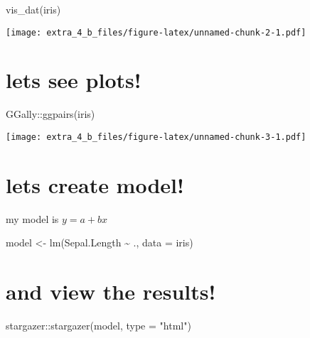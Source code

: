 \documentclass[
]{article}
\newenvironment{Shaded}{\begin{snugshade}}{\end{snugshade}}
\newcommand{\AttributeTok}[1]{\textcolor[rgb]{0.77,0.63,0.00}{#1}}
\newcommand{\FunctionTok}[1]{\textcolor[rgb]{0.00,0.00,0.00}{#1}}
\newcommand{\NormalTok}[1]{#1}
\newcommand{\OtherTok}[1]{\textcolor[rgb]{0.56,0.35,0.01}{#1}}
\newcommand{\SpecialCharTok}[1]{\textcolor[rgb]{0.00,0.00,0.00}{#1}}
\newcommand{\StringTok}[1]{\textcolor[rgb]{0.31,0.60,0.02}{#1}}
\begin{document}
\begin{Shaded}
\begin{Highlighting}[]
\FunctionTok{vis\_dat}\NormalTok{(iris)}
\end{Highlighting}
\end{Shaded}

\texttt{[image: extra\_4\_b\_files/figure-latex/unnamed-chunk-2-1.pdf]}

\hypertarget{lets-see-plots}{%
\section{lets see plots!}\label{lets-see-plots}}

\begin{Shaded}
\begin{Highlighting}[]
\NormalTok{GGally}\SpecialCharTok{::}\FunctionTok{ggpairs}\NormalTok{(iris)}
\end{Highlighting}
\end{Shaded}

\texttt{[image: extra\_4\_b\_files/figure-latex/unnamed-chunk-3-1.pdf]}

\hypertarget{lets-create-model}{%
\section{lets create model!}\label{lets-create-model}}

my model is \(y = a + bx\)

\begin{Shaded}
\begin{Highlighting}[]
\NormalTok{model }\OtherTok{\textless{}{-}} \FunctionTok{lm}\NormalTok{(Sepal.Length }\SpecialCharTok{\textasciitilde{}}\NormalTok{ ., }\AttributeTok{data =}\NormalTok{ iris)}
\end{Highlighting}
\end{Shaded}

\hypertarget{and-view-the-results}{%
\section{and view the results!}\label{and-view-the-results}}

\begin{Shaded}
\begin{Highlighting}[]
\NormalTok{stargazer}\SpecialCharTok{::}\FunctionTok{stargazer}\NormalTok{(model, }\AttributeTok{type =} \StringTok{"html"}\NormalTok{)}
\end{Highlighting}
\end{Shaded}
\end{document}
